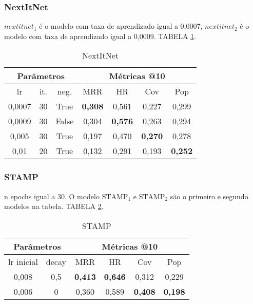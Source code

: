 \subsubsection{NextItNet}
$nextitnet_1$ é o modelo com taxa de aprendizado igual a 0,0007, $nextitnet_2$ é
o modelo com taxa de aprendizado igual a 0,0009. TABELA \ref{app:nextitnet}.
\begin{table}
  \centering
  \begin{tabular}{|c|c|c|c|c|c|c|}
    \hline
      \multicolumn{3}{|c|}{Parâmetros} & \multicolumn{4}{c|}{Métricas @10} \\
      \hline
      lr & it. & neg. & MRR & HR & Cov & Pop \\
      \hline
      0,0007 & 30 & True & \textbf{0,308} & 0,561 & 0,227 & 0,299 \\
      \hline
      0,0009 & 30 & False & 0,304 & \textbf{0,576} & 0,263 & 0,294 \\
      \hline
      0,005 & 30 & True & 0,197 & 0,470 & \textbf{0,270} & 0,278 \\
      \hline
      0,01 & 20 & True & 0,132 & 0,291 & 0,193 & \textbf{0,252} \\
      \hline
    \end{tabular}
    \caption{NextItNet} \label{app:nextitnet}
\end{table}

\subsubsection{STAMP}


n epochs igual a 30. O modelo $\text{STAMP}_{1}$ e $\text{STAMP}_{2}$
são o primeiro e segundo modelos na tabela. TABELA \ref{app:stamp}.

\begin{table}
  \centering
  \begin{tabular}{|c|c|c|c|c|c|}
    \hline
      \multicolumn{2}{|c|}{Parâmetros} & \multicolumn{4}{c|}{Métricas @10} \\
      \hline
      lr inicial & decay & MRR & HR & Cov & Pop \\
      \hline
      0,008 & 0,5 & \textbf{0,413} & \textbf{0,646} & 0,312 & 0,229 \\
      \hline
      0,006 & 0 & 0,360 & 0,589 & \textbf{0,408} & \textbf{0,198} \\
      \hline
    \end{tabular}
    \caption{STAMP} \label{app:stamp}
\end{table}


